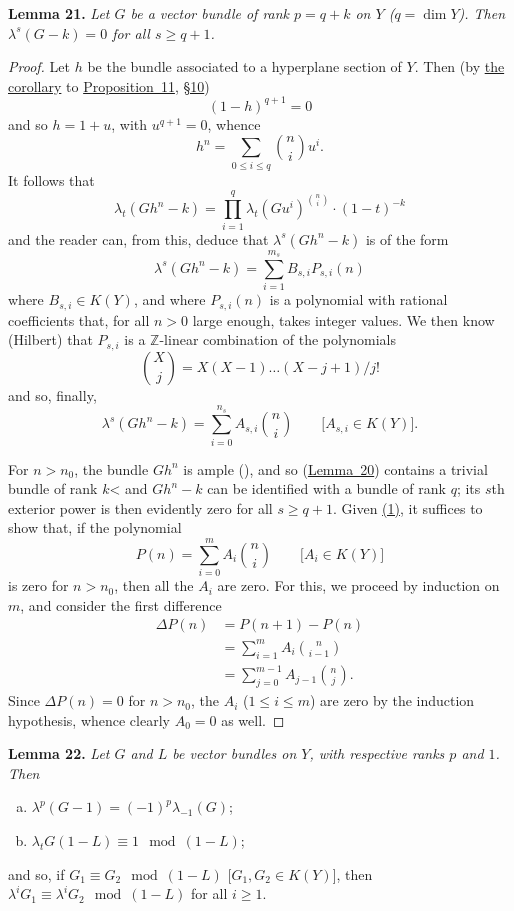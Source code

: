 \documentclass{article}
\newenvironment{itenv}[1]
  {\phantomsection\par\medskip\noindent\textbf{#1.}\itshape}
  {\medskip}
\renewcommand{\geq}{\geqslant}
\renewcommand{\leq}{\leqslant}
\newcommand{\oldpage}[1]{\marginpar{\footnotesize$\Big\vert$ \textit{p.~#1}}}
\begin{document}
\begin{itenv}{Lemma 21}
\label{lemma21}
  Let $G$ be a vector bundle of rank $p=q+k$ on $Y$ ($q=\dim Y$).
  Then $\lambda^s(G- k)=0$ for all $s\geq q+1$.
\end{itenv}

\begin{proof}
  Let $h$ be the bundle associated to a hyperplane section of $Y$.
  Then (by \hyperref[corollary-11]{the corollary} to \hyperref[proposition11]{Proposition~11}, \hyperref[section10]{\S10})
  \[
    (1-h)^{q+1} = 0
  \]
  and so $h=1+u$, with $u^{q+1}=0$, whence
  \[
    h^n = \sum_{0\leq i\leq q}\binom{n}{i}u^i.
  \]
  It follows that
  \[
    \lambda_t(Gh^n- k) = \prod_{i=1}^q \lambda_t(Gu^i)^{\binom{n}{i}}\cdot(1-t)^{-k}
  \]
  and the reader can, from this, deduce that $\lambda^s(Gh^n- k)$ is of the form
  \[
    \lambda^s(Gh^n- k) = \sum_{i=1}^{m_s} B_{s,i}P_{s,i}(n)
  \]
  where $B_{s,i}\in K(Y)$, and where $P_{s,i}(n)$ is a polynomial with rational coefficients that, for all $n>0$ large enough, takes integer values.
  We then know (Hilbert) that $P_{s,i}$ is a $\mathbb{Z}$-linear combination of the polynomials
  \[
    \binom{X}{j} = X(X-1)\ldots(X-j+1)/j!
  \]
  and so, finally,
  \[
  \label{lemma21equation1}
    \lambda^s(Gh^n- k) = \sum_{i=0}^{n_s} A_{s,i}\binom{n}{i}
    \qquad\mbox{[$A_{s,i}\in K(Y)$].}
    \tag{1}
  \]

  For $n>n_0$, the bundle $Gh^n$ is ample (\cite{12}), and so (\hyperref[lemma20]{Lemma~20}) contains a trivial bundle of rank $k$< and $Gh^n- k$ can be identified with a bundle of rank $q$;
  its $s$th exterior power is then evidently zero for all $s\geq q+1$.
  Given \hyperref[lemma21equation1]{(1)}, it
\oldpage{134}
  suffices to show that, if the polynomial
  \[
    P(n) = \sum_{i=0}^m A_i\binom{n}{i}
    \qquad\mbox{[$A_i\in K(Y)$]}
  \]
  is zero for $n>n_0$, then all the $A_i$ are zero.
  For this, we proceed by induction on $m$, and consider the first difference
  \begin{align*}
    \Delta P(n)
    &= P(n+1) - P(n)
  \\&= \sum_{i=1}^m A_i\binom{n}{i-1}
  \\&= \sum_{j=0}^{m-1} A_{j-1}\binom{n}{j}.
  \end{align*}
  Since $\Delta P(n)=0$ for $n>n_0$, the $A_i$ ($1\leq i\leq m$) are zero by the induction hypothesis, whence clearly $A_0=0$ as well.
\end{proof}

\begin{itenv}{Lemma 22}
\label{lemma22}
  Let $G$ and $L$ be vector bundles on $Y$, with respective ranks $p$ and $1$.
  Then
  \begin{enumerate}[(a)]
    \item $\lambda^p(G-1) = (-1)^p\lambda_{-1}(G)$;
    \item $\lambda_t G(1- L) \equiv 1\mod(1-L)$;
  \end{enumerate}
  and so, if $G_1\equiv G_2\mod(1-L)$ [$G_1,G_2\in K(Y)$], then $\lambda^iG_1\equiv\lambda^iG_2\mod(1-L)$ for all $i\geq1$.
\end{itenv}
\end{document}
